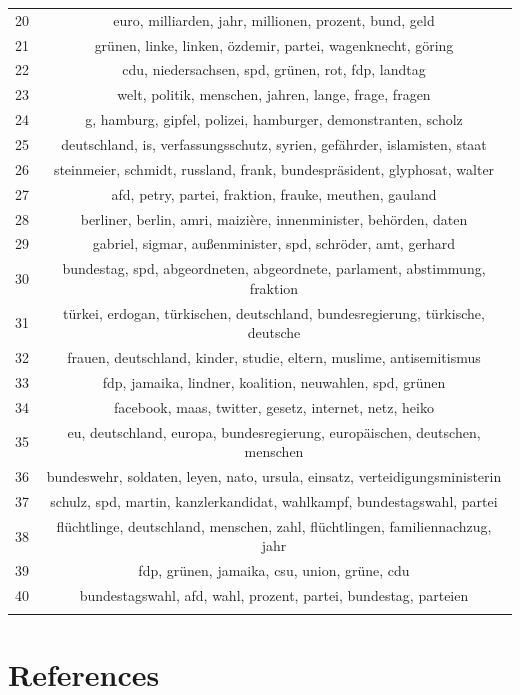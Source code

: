 \documentclass[
]{article}
\begin{document}
\begin{table}[!htbp]
\begin{tabular}{@{\extracolsep{5pt}} cc}
20 & euro, milliarden, jahr, millionen, prozent, bund, geld \\ 
21 & grünen, linke, linken, özdemir, partei, wagenknecht, göring \\ 
22 & cdu, niedersachsen, spd, grünen, rot, fdp, landtag \\ 
23 & welt, politik, menschen, jahren, lange, frage, fragen \\ 
24 & g, hamburg, gipfel, polizei, hamburger, demonstranten, scholz \\ 
25 & deutschland, is, verfassungsschutz, syrien, gefährder, islamisten, staat \\ 
26 & steinmeier, schmidt, russland, frank, bundespräsident, glyphosat, walter \\ 
27 & afd, petry, partei, fraktion, frauke, meuthen, gauland \\ 
28 & berliner, berlin, amri, maizière, innenminister, behörden, daten \\ 
29 & gabriel, sigmar, außenminister, spd, schröder, amt, gerhard \\ 
30 & bundestag, spd, abgeordneten, abgeordnete, parlament, abstimmung, fraktion \\ 
31 & türkei, erdogan, türkischen, deutschland, bundesregierung, türkische, deutsche \\ 
32 & frauen, deutschland, kinder, studie, eltern, muslime, antisemitismus \\ 
33 & fdp, jamaika, lindner, koalition, neuwahlen, spd, grünen \\ 
34 & facebook, maas, twitter, gesetz, internet, netz, heiko \\ 
35 & eu, deutschland, europa, bundesregierung, europäischen, deutschen, menschen \\ 
36 & bundeswehr, soldaten, leyen, nato, ursula, einsatz, verteidigungsministerin \\ 
37 & schulz, spd, martin, kanzlerkandidat, wahlkampf, bundestagswahl, partei \\ 
38 & flüchtlinge, deutschland, menschen, zahl, flüchtlingen, familiennachzug, jahr \\ 
39 & fdp, grünen, jamaika, csu, union, grüne, cdu \\ 
40 & bundestagswahl, afd, wahl, prozent, partei, bundestag, parteien \\ 
\hline \\[-1.8ex] 
\end{tabular} 
\end{table}

\hypertarget{references}{%
\section*{References}\label{references}}
\end{document}
